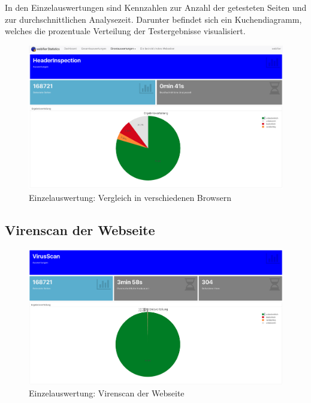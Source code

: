 In den Einzelauswertungen sind Kennzahlen zur Anzahl der getesteten Seiten und zur durchschnittlichen Analysezeit. Darunter befindet sich ein Kuchendiagramm, welches die prozentuale Verteilung der Testergebnisse visualisiert.
\begin{figure}[H]
  \centering
  \includegraphics[width=15cm]{images/stats/headerinspection}
  \caption[Einzelauswertung: Vergleich in verschiedenen Browsern]{Einzelauswertung: Vergleich in verschiedenen Browsern\protect\footnotemark}
  \label{fig:analyse-headerinspection}
\end{figure}

\subsection{Virenscan der Webseite}
\begin{figure}[H]
  \centering
  \includegraphics[width=15cm]{images/stats/virusscan}
  \caption[Einzelauswertung: Virenscan der Webseite]{Einzelauswertung: Virenscan der Webseite\protect\footnotemark}
  \label{fig:analyse-virusscan}
\end{figure}

